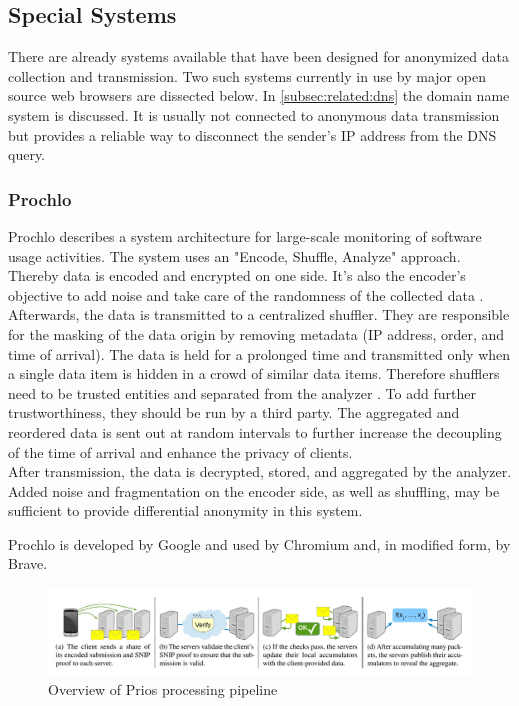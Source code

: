     
    \subsection{Special Systems}
        \label{subsec:related:special}
        There are already systems available that have been designed for anonymized data collection and transmission. 
        Two such systems currently in use by major open source web browsers are dissected below. In \ref{subsec:related:dns} the domain name system is discussed. It is usually not connected to anonymous data transmission but provides a reliable way to disconnect the sender's IP address from the DNS query.
        
    \subsubsection{Prochlo}
        Prochlo describes a system architecture for large-scale monitoring of software usage activities. The system uses an "Encode, Shuffle, Analyze" approach. Thereby data is encoded and encrypted on one side. It's also the encoder's objective to add noise and take care of the randomness of the collected data \cite{bittau_prochlo_2017}.\\
        Afterwards, the data is transmitted to a centralized shuffler. They are responsible for the masking of the data origin by removing metadata (IP address, order, and time of arrival).
        The data is held for a prolonged time and transmitted only when a single data item is hidden in a crowd of similar data items. Therefore shufflers need to be trusted entities and separated from the analyzer \cite{bittau_prochlo_2017}. To add further trustworthiness, they should be run by a third party. The aggregated and reordered data is sent out at random intervals to further increase the decoupling of the time of arrival and enhance the privacy of clients.\\
        After transmission, the data is decrypted, stored, and aggregated by the analyzer. 
        Added noise and fragmentation on the encoder side, as well as shuffling, may be sufficient to provide differential anonymity in this system.
        
        Prochlo is developed by Google and used by Chromium and, in modified form, by Brave.
        \begin{figure}[hb]
            \centering
            \includegraphics[width=\textwidth]{latex/figures/prio_overview.jpg}
            \caption[Overview of Prios processing pipeline]{Overview of Prios processing pipeline \cite{corrigan-gibbs_prio_2017}}
            \label{fig:prio_overview}
        \end{figure}
    
